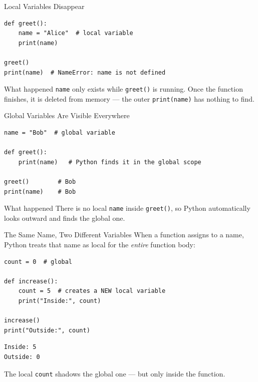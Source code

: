 \documentclass[9pt,aspectratio=169,xcolor=table]{beamer}
\begin{document}
\begin{frame}[fragile]{Local Variables Disappear}
    \leavevmode
\begin{lstlisting}
def greet():
    name = "Alice"  # local variable
    print(name)

greet()
print(name)  # NameError: name is not defined
\end{lstlisting}

    \vspace{2mm}
    \begin{alertblock}{What happened}
        \texttt{name} only exists while \texttt{greet()} is running.
        Once the function finishes, it is \alert{deleted from memory}
        --- the outer \texttt{print(name)} has nothing to find.
    \end{alertblock}
\end{frame}

\begin{frame}[fragile]{Global Variables Are Visible Everywhere}
    \leavevmode
\begin{lstlisting}
name = "Bob"  # global variable

def greet():
    print(name)   # Python finds it in the global scope

greet()        # Bob
print(name)    # Bob
\end{lstlisting}

    \vspace{2mm}
    \begin{block}{What happened}
        There is no local \texttt{name} inside \texttt{greet()}, so
        Python automatically looks outward and finds the global one.
    \end{block}
\end{frame}

\begin{frame}[fragile]{The Same Name, Two Different Variables}
    \leavevmode
    When a function \alert{assigns} to a name, Python treats that name
    as local for the \emph{entire} function body:

\begin{lstlisting}
count = 0  # global

def increase():
    count = 5  # creates a NEW local variable
    print("Inside:", count)

increase()
print("Outside:", count)
\end{lstlisting}
\begin{lstlisting}[style=skoutput]
Inside: 5
Outside: 0
\end{lstlisting}

    \vspace{1mm}
    {\small The local \texttt{count} \alert{shadows} the global one ---
    but only inside the function.}
\end{frame}
\end{document}
